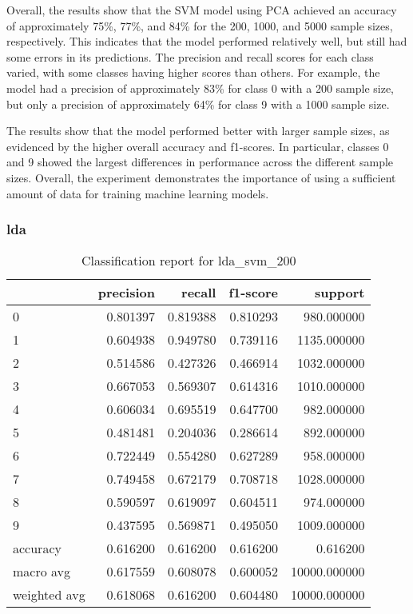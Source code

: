 Overall, the results show that the SVM model using PCA achieved an accuracy of approximately 75\%, 77\%, and 84\% for the 200, 1000, and 5000 sample sizes, respectively. This indicates that the model performed relatively well, but still had some errors in its predictions. The precision and recall scores for each class varied, with some classes having higher scores than others. For example, the model had a precision of approximately 83\% for class 0 with a 200 sample size, but only a precision of approximately 64\% for class 9 with a 1000 sample size.

The results show that the model performed better with larger sample sizes, as evidenced by the higher overall accuracy and f1-scores. In particular, classes 0 and 9 showed the largest differences in performance across the different sample sizes. Overall, the experiment demonstrates the importance of using a sufficient amount of data for training machine learning models.

\subsubsection{\gls{lda}}\label{subsubsec:experiment_4_lda}

\begin{table}[htb!]
    \centering
    \caption{Classification report for lda_svm_200}
    \label{tab:classification-report-lda_svm_200}
    \begin{tabular}{lrrrr}
    \toprule
    & precision & recall & f1-score & support \\
    \midrule
    0 & 0.801397 & 0.819388 & 0.810293 & 980.000000 \\
    1 & 0.604938 & 0.949780 & 0.739116 & 1135.000000 \\
    2 & 0.514586 & 0.427326 & 0.466914 & 1032.000000 \\
    3 & 0.667053 & 0.569307 & 0.614316 & 1010.000000 \\
    4 & 0.606034 & 0.695519 & 0.647700 & 982.000000 \\
    5 & 0.481481 & 0.204036 & 0.286614 & 892.000000 \\
    6 & 0.722449 & 0.554280 & 0.627289 & 958.000000 \\
    7 & 0.749458 & 0.672179 & 0.708718 & 1028.000000 \\
    8 & 0.590597 & 0.619097 & 0.604511 & 974.000000 \\
    9 & 0.437595 & 0.569871 & 0.495050 & 1009.000000 \\
    accuracy & 0.616200 & 0.616200 & 0.616200 & 0.616200 \\
    macro avg & 0.617559 & 0.608078 & 0.600052 & 10000.000000 \\
    weighted avg & 0.618068 & 0.616200 & 0.604480 & 10000.000000 \\
    \bottomrule
    \end{tabular}
    \end{table}

